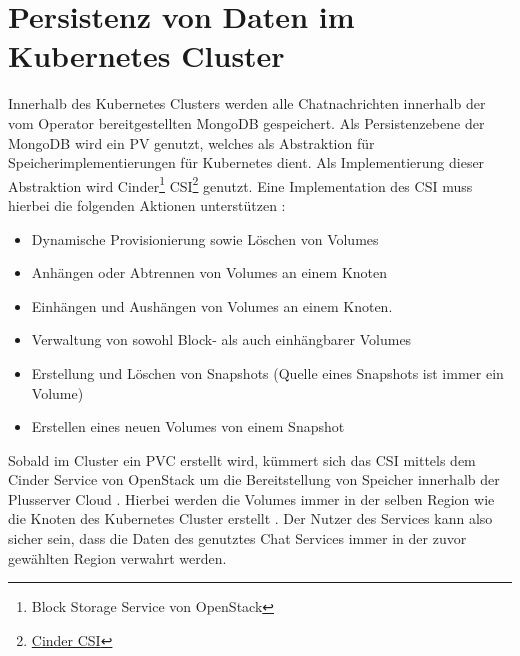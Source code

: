 \section{Persistenz von Daten im Kubernetes Cluster}
\label{subsec:datenschutz:persistenz}
Innerhalb des Kubernetes Clusters werden alle Chatnachrichten innerhalb der vom Operator bereitgestellten MongoDB gespeichert.
Als Persistenzebene der MongoDB wird ein \ac{PV} genutzt,
welches als Abstraktion für Speicherimplementierungen für Kubernetes dient.
Als Implementierung dieser Abstraktion wird 
Cinder\footnote{Block Storage Service von OpenStack} \ac{CSI}\footnote{\href{https://github.com/kubernetes/cloud-provider-openstack/tree/master/pkg/csi/cinder}{Cinder CSI}} genutzt. 
Eine Implementation des \ac{CSI} muss hierbei die folgenden Aktionen unterstützen \cite{container-storage-interface_2021}:
\begin{itemize}
  \item Dynamische Provisionierung sowie Löschen von Volumes
  \item Anhängen oder Abtrennen von Volumes an einem Knoten
  \item Einhängen und Aushängen von Volumes an einem Knoten.
  \item Verwaltung von sowohl Block- als auch einhängbarer Volumes
  \item Erstellung und Löschen von Snapshots (Quelle eines Snapshots ist immer ein Volume)
  \item Erstellen eines neuen Volumes von einem Snapshot
\end{itemize}

Sobald im Cluster ein \ac{PVC} erstellt wird, kümmert sich das \ac{CSI} mittels dem Cinder Service von OpenStack 
um die Bereitstellung von Speicher innerhalb der Plusserver Cloud \cite{cinderCSI}.
Hierbei werden die Volumes immer in der selben Region wie die Knoten des Kubernetes Cluster erstellt \cite{kubernetesVolumes}.
Der Nutzer des Services kann also sicher sein, dass die Daten des genutztes Chat Services immer in der zuvor 
gewählten Region verwahrt werden.